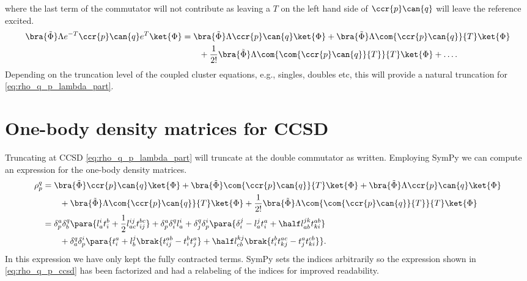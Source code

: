     where the last term of the commutator will not contribute as leaving a $T$
    on the left hand side of $\ccr{p}\can{q}$ will leave the reference excited.
    \begin{align}
        \bra{\tilde{\Phi}}\Lambda e^{-T}\ccr{p}\can{q}e^T\ket{\Phi}
        &= \bra{\tilde{\Phi}}\Lambda \ccr{p}\can{q}\ket{\Phi}
        + \bra{\tilde{\Phi}}\Lambda \com{\ccr{p}\can{q}}{T}\ket{\Phi}
        \nonumber \\
        &\qquad
        + \frac{1}{2!}
        \bra{\tilde{\Phi}}\Lambda \com{\com{\ccr{p}\can{q}}{T}}{T}\ket{\Phi}
        + \dots.
        \label{eq:rho_q_p_lambda_part}
    \end{align}
    Depending on the truncation level of the coupled cluster equations, e.g.,
    singles, doubles etc, this will provide a natural truncation for
    \autoref{eq:rho_q_p_lambda_part}.

    \section{One-body density matrices for CCSD}
        Truncating at CCSD \autoref{eq:rho_q_p_lambda_part} will truncate at the
        double commutator as written. Employing SymPy\cite{sympy} we can compute
        an expression for the one-body density matrices.
        \begin{align}
            \rho^{q}_{p}
            &= \bra{\tilde{\Phi}}\ccr{p}\can{q}\ket{\Phi}
            + \bra{\tilde{\Phi}}\com{\ccr{p}\can{q}}{T}\ket{\Phi}
            + \bra{\tilde{\Phi}}\Lambda \ccr{p}\can{q}\ket{\Phi}
            \nonumber \\
            &\qquad
            + \bra{\tilde{\Phi}}\Lambda \com{\ccr{p}\can{q}}{T}\ket{\Phi}
            + \frac{1}{2!}
            \bra{\tilde{\Phi}}\Lambda \com{\com{\ccr{p}\can{q}}{T}}{T}\ket{\Phi}
            \\
            &=
            \delta^a_p \delta^q_b \para{
                l^i_a t^b_i + \frac{1}{2} l^{ij}_{ac} t^{bc}_{ij}
            }
            + \delta^a_p \delta^q_i l^i_a
            + \delta^q_j \delta^i_p \para{
                \delta^j_i
                - l^j_a t^a_i
                + \half l^{jk}_{ab} t^{ab}_{ki}
            }
            \nonumber \\
            &\qquad
            + \delta^q_a \delta^i_p \para{
                t^a_i
                + l^j_b \brak{
                    t^{ab}_{ij} - t^b_i t^a_j
                }
                + \half l^{kj}_{cb} \brak{
                    t^{b}_{i} t^{ac}_{kj}
                    - t^a_j t^{cb}_{ki}
                }
            }.
            \label{eq:rho_q_p_ccsd}
        \end{align}
        In this expression we have only kept the fully contracted terms. SymPy
        sets the indices arbitrarily so the expression shown in
        \autoref{eq:rho_q_p_ccsd} has been factorized and had a relabeling of
        the indices for improved readability.
